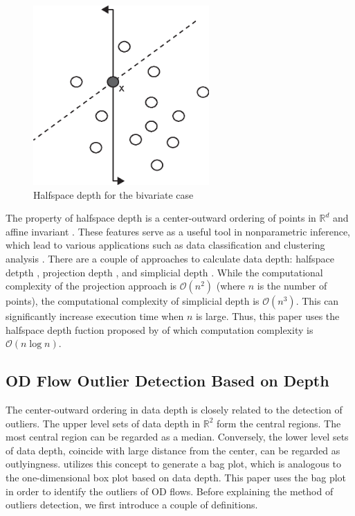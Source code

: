 \documentclass[a4paper,UKenglish]{lipics-v2016}
\begin{document}
\begin{figure}
	\centering
	\includegraphics[width=0.6\textwidth]{images/depth_bi.eps}
	\caption{Halfspace depth for the bivariate case}
	\label{fig:hd_bi}	
\end{figure}

The property of halfspace depth is a center-outward ordering of points in  $\mathbb{R}^d$ and affine invariant \cite{Mosler13book}. These features serve as a useful tool in nonparametric inference, which lead to various applications such as data classification and clustering analysis
\cite{lange14fSP,jeong16acmgis}. There are a couple of approaches to calculate data depth: halfspace detpth \cite{rousseeuw96RSS}, projection depth \cite{wilcox03CSSC}, and simplicial depth \cite{liu90AS}. While the computational complexity of the projection approach is $\mathcal{O}(n^2)$ (where $n$ is the number of points), the computational complexity of simplicial depth is $\mathcal{O}(n^3)$. This can significantly increase execution time when $n$ is large. Thus, this paper uses the halfspace depth fuction proposed by \cite{rousseeuw96RSS} of which computation complexity is $\mathcal{O}(n\log{}n)$.

\subsection{OD Flow Outlier Detection Based on Depth}
The center-outward ordering in data depth is closely related to the detection of outliers.
The upper level sets of data depth in $\mathbb{R}^2$ form the central regions.
The most central region can be regarded as a median.
Conversely, the lower level sets of data depth, coincide with large distance from the center, can be regarded as outlyingness. \cite{rousseeuw99AS,aplpackR} utilizes this concept to generate a bag plot, which is analogous to the one-dimensional box plot based on data depth.
This paper uses the bag plot in order to identify the outliers of OD flows. 
Before explaining the method of outliers detection, we first introduce a couple of definitions.
\end{document}
